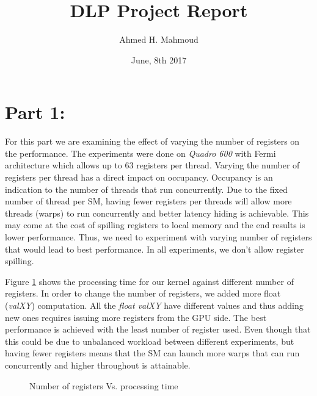 \documentclass[12pt] {article}
\begin{document}
\title{DLP Project Report}
\author{Ahmed H. Mahmoud}
\date{June, 8th 2017}
\maketitle

\section*{Part 1:}
For this part we are examining the effect of varying the number of registers on the performance. The experiments were done on \emph{Quadro 600} with Fermi architecture which allows up to 63 registers per thread. Varying the number of registers per thread has a direct impact on occupancy. Occupancy is an indication to the number of threads that run concurrently. Due to the fixed number of thread per SM, having fewer registers per threads will allow more threads (warps) to run concurrently and better latency hiding is achievable. This may come at the cost of spilling registers to local memory and the end results is lower performance. Thus, we need to experiment with varying number of registers that would lead to best performance. In all experiments, we don't allow register spilling. 

Figure \ref{fig:regs} shows the processing time for our kernel against different number of registers. In order to change the number of registers, we added more float (\emph{valXY}) computation. All the \emph{float valXY} have different values and thus adding new ones requires issuing more registers from the GPU side. The best performance is achieved with the least number of register used. Even though that this could be due to unbalanced workload between different experiments, but having fewer registers means that the SM can launch more warps that can run concurrently and higher throughout is attainable. 

\begin{figure}[!tbh]
 \centering        
     \caption{Number of registers Vs. processing time}
   \label{fig:regs}
\end{figure}  
\end{document}
